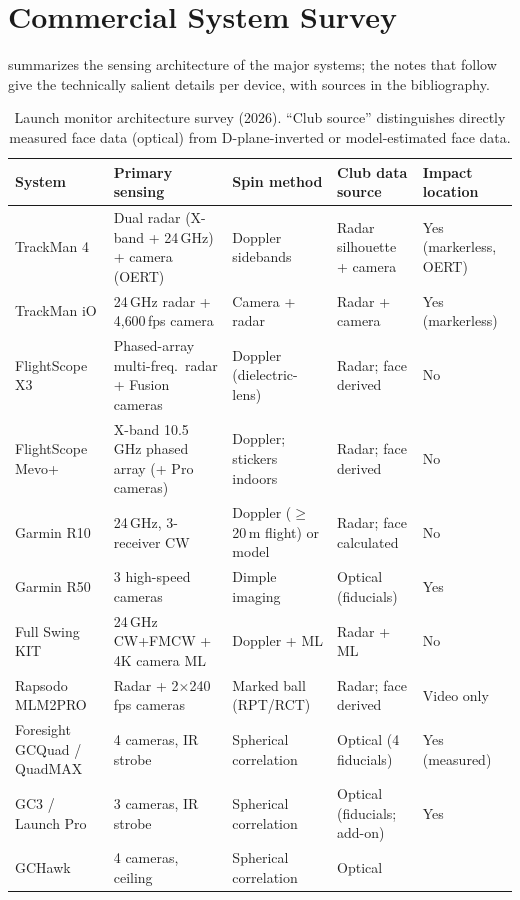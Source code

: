 \chapter{Commercial System Survey}
\label{ch:survey}

 summarizes the sensing architecture of the major
systems; the notes that follow give the technically salient details per
device, with sources in the bibliography.

\begin{table}[htbp]
\centering\footnotesize
\caption{Launch monitor architecture survey (2026). ``Club source''
distinguishes directly measured face data (optical) from D-plane-inverted
or model-estimated face data.}
\label{tab:survey}
\begin{tabular}{@{}p{2.6cm}p{3.3cm}p{2.6cm}p{2.9cm}p{2.9cm}@{}}
\toprule
\textbf{System} & \textbf{Primary sensing} & \textbf{Spin method} &
\textbf{Club data source} & \textbf{Impact location} \\
\midrule
TrackMan 4 & Dual radar (X-band + 24\,GHz) + camera (OERT) &
  Doppler sidebands & Radar silhouette + camera & Yes (markerless, OERT) \\
TrackMan iO & 24\,GHz radar + 4{,}600\,fps camera & Camera + radar &
  Radar + camera & Yes (markerless) \\
FlightScope X3 & Phased-array multi-freq.\ radar + Fusion cameras &
  Doppler (dielectric-lens) & Radar; face derived & No \\
FlightScope Mevo+ & X-band 10.5\,GHz phased array (+ Pro cameras) &
  Doppler; stickers indoors & Radar; face derived & No \\
Garmin R10 & 24\,GHz, 3-receiver CW & Doppler ($\ge$20\,m flight) or
  model & Radar; face calculated & No \\
Garmin R50 & 3 high-speed cameras & Dimple imaging & Optical
  (fiducials) & Yes \\
Full Swing KIT & 24\,GHz CW+FMCW + 4K camera ML & Doppler + ML &
  Radar + ML & No \\
Rapsodo MLM2PRO & Radar + 2$\times$240\,fps cameras & Marked ball
  (RPT/RCT) & Radar; face derived & Video only \\
Foresight GCQuad / QuadMAX & 4 cameras, IR strobe & Spherical
  correlation & Optical (4 fiducials) & Yes (measured) \\
GC3 / Launch Pro & 3 cameras, IR strobe & Spherical correlation &
  Optical (fiducials; add-on) & Yes \\
GCHawk & 4 cameras, ceiling & Spherical correlation & Optical &

\end{tabular}
\end{table}

